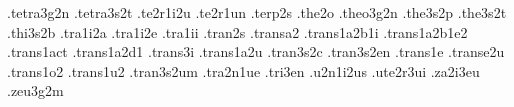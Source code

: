 {.tetra3g2n                        %
.tetra3s2t                        %
.te2r1i2u                         %
.te2r1un                          %
.terp2s                           %
.the2o
.theo3g2n                         %
.the3s2p                          %
.the3s2t                          %
.thi3s2b                          %
.tra1i2a .tra1i2e .tra1ii         %
.tran2s
.transa2
.trans1a2b1i                      %
.trans1a2b1e2                     %
.trans1act                        %
.trans1a2d1                       %
.trans3i                          %
.trans1a2u                        %
.tran3s2c                         %
.tran3s2en                        %
.trans1e .transe2u                %
.trans1o2                         %
.trans1u2                         %
.tran3s2um                        %
.tra2n1ue                         %
.tri3en                           %
.u2n1i2us                         %
.ute2r3ui                         %
.za2i3eu                          %
.zeu3g2m                          %
%
}
